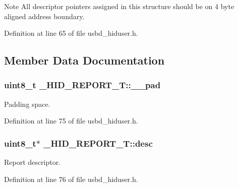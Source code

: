 \begin{DoxyNote}{Note}
All descriptor pointers assigned in this structure should be on 4 byte aligned address boundary. 
\end{DoxyNote}


Definition at line 65 of file usbd\+\_\+hiduser.\+h.



\subsection{Member Data Documentation}
\subsubsection[{\texorpdfstring{\+\_\+\+\_\+pad}{__pad}}]{\setlength{\rightskip}{0pt plus 5cm}uint8\+\_\+t \+\_\+\+H\+I\+D\+\_\+\+R\+E\+P\+O\+R\+T\+\_\+\+T\+::\+\_\+\+\_\+pad}\hypertarget{struct__HID__REPORT__T_a9d56a95a8b9dbdc3bfaec651d23bd360}{}\label{struct__HID__REPORT__T_a9d56a95a8b9dbdc3bfaec651d23bd360}
Padding space. 

Definition at line 75 of file usbd\+\_\+hiduser.\+h.

\subsubsection[{\texorpdfstring{desc}{desc}}]{\setlength{\rightskip}{0pt plus 5cm}uint8\+\_\+t$\ast$ \+\_\+\+H\+I\+D\+\_\+\+R\+E\+P\+O\+R\+T\+\_\+\+T\+::desc}\hypertarget{struct__HID__REPORT__T_a312421c8506e4dcd1ba2d40a9c409211}{}\label{struct__HID__REPORT__T_a312421c8506e4dcd1ba2d40a9c409211}
Report descriptor. 

Definition at line 76 of file usbd\+\_\+hiduser.\+h.


